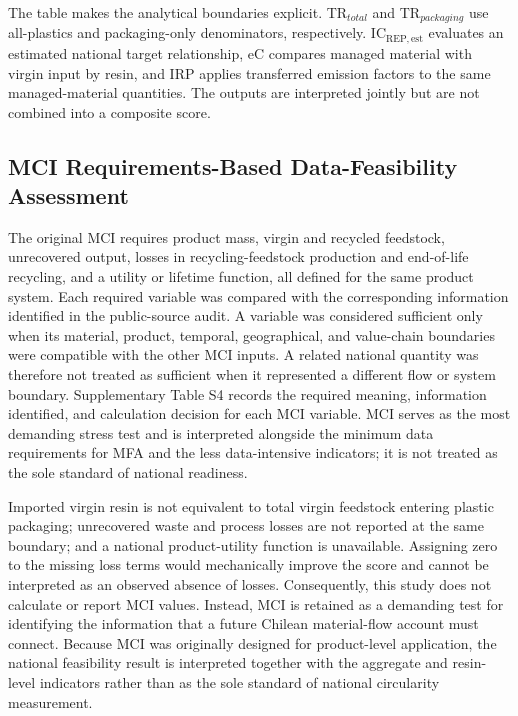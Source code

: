 \documentclass[review,10pt]{elsarticle}
\newcommand{\revpar}[1]{#1\par\medskip}
\newcommand{\changepar}[1]{#1\par\medskip}
\begin{document}
\revpar{The table makes the analytical boundaries explicit. TR$_{total}$ and TR$_{packaging}$ use all-plastics and packaging-only denominators, respectively. IC$_{\mathrm{REP,est}}$ evaluates an estimated national target relationship, eC compares managed material with virgin input by resin, and IRP applies transferred emission factors to the same managed-material quantities. The outputs are interpreted jointly but are not combined into a composite score.}

\subsection{MCI Requirements-Based Data-Feasibility Assessment}

\changepar{The original MCI requires product mass, virgin and recycled feedstock, unrecovered output, losses in recycling-feedstock production and end-of-life recycling, and a utility or lifetime function, all defined for the same product system. Each required variable was compared with the corresponding information identified in the public-source audit. A variable was considered sufficient only when its material, product, temporal, geographical, and value-chain boundaries were compatible with the other MCI inputs. A related national quantity was therefore not treated as sufficient when it represented a different flow or system boundary. Supplementary Table S4 records the required meaning, information identified, and calculation decision for each MCI variable. MCI serves as the most demanding stress test and is interpreted alongside the minimum data requirements for MFA and the less data-intensive indicators; it is not treated as the sole standard of national readiness.}

\changepar{Imported virgin resin is not equivalent to total virgin feedstock entering plastic packaging; unrecovered waste and process losses are not reported at the same boundary; and a national product-utility function is unavailable. Assigning zero to the missing loss terms would mechanically improve the score and cannot be interpreted as an observed absence of losses. Consequently, this study does not calculate or report MCI values. Instead, MCI is retained as a demanding test for identifying the information that a future Chilean material-flow account must connect. Because MCI was originally designed for product-level application, the national feasibility result is interpreted together with the aggregate and resin-level indicators rather than as the sole standard of national circularity measurement.}
\end{document}

